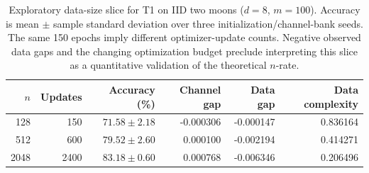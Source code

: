 \begin{table}[t]
\centering\footnotesize
\caption{Exploratory data-size slice for T1 on IID two moons ($d=8$, $m=100$). Accuracy is mean $\pm$ sample standard deviation over three initialization/channel-bank seeds. The same 150 epochs imply different optimizer-update counts. Negative observed data gaps and the changing optimization budget preclude interpreting this slice as a quantitative validation of the theoretical $n$-rate.}
\label{tab:app_data_size}
\begin{tabular}{rrrrrr}
\toprule
$n$ & Updates & Accuracy (\%) & Channel gap & Data gap & Data complexity\\
\midrule
128 & 150 & $71.58\pm2.18$ & -0.000306 & -0.000147 & 0.836164\\
512 & 600 & $79.52\pm2.60$ & 0.000100 & -0.002194 & 0.414271\\
2048 & 2400 & $83.18\pm0.60$ & 0.000768 & -0.006346 & 0.206496\\
\bottomrule
\end{tabular}
\end{table}
